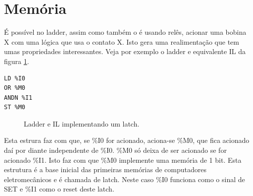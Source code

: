 \section{Memória}
É possível no ladder, assim como também o é usando relês, acionar uma bobina X com uma lógica que usa o contato X. Isto gera uma realimentação que tem umas propriedades interessantes. Veja por exemplo o ladder e equivalente IL da figura \ref{fig:ladder_latch}.

\newsavebox\mybox
\begin{lrbox}{\mybox}
\begin{minipage}[b]{0.3\textwidth}
\begin{lstlisting}[]
LD %I0
OR %M0
ANDN %I1
ST %M0
\end{lstlisting}
\end{minipage}
\end{lrbox}


\begin{figure}[hbt]
	\centering
	\qquad\qquad
	\subfloat[IL]{\centering\usebox{\mybox}
	}
	\caption{Ladder e IL implementando um latch.}
	\label{fig:ladder_latch}
\end{figure}

Esta estrura faz com que, se \%I0 for acionado, aciona-se \%M0, que fica acionado daí por diante independente de \%I0. \%M0 só deixa de ser acionado se for acionado \%I1. Isto faz com que \%M0 implemente uma memória de 1 bit. Esta estrutura é a base inicial das primeiras memórias de computadores eletromecânicos e é chamada de latch. Neste caso \%I0 funciona como o sinal de SET e \%I1 como o reset deste latch.

